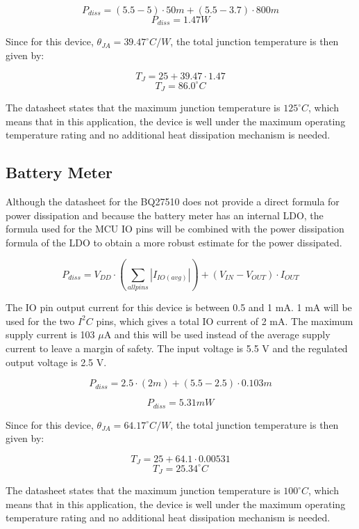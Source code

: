\documentclass[12pt,letterpaper]{article}
\begin{document}
\[P_{diss} = \left(5.5 - 5\right)\cdot 50m + \left(5.5 - 3.7\right)\cdot 800m\]
\[\boxed{P_{diss} = 1.47W}\]

Since for this device, $\theta_{JA} = 39.47^\circ C/W$, the total junction temperature is then given by:

\[T_J = 25 + 39.47 \cdot 1.47 \]
\[\boxed{T_J = 86.0 ^\circ C}\]

The datasheet states that the maximum junction temperature is $125^\circ C$, which means that in this application, the device is well under the maximum operating temperature rating and no additional heat dissipation mechanism is needed.

\subsection{Battery Meter}
Although the datasheet for the BQ27510 does not provide a direct formula for power dissipation and because the battery meter has an internal LDO, the formula used for the MCU IO pins will be combined with the power dissipation formula of the LDO to obtain a more robust estimate for the power dissipated.  

\[P_{diss} = V_{DD} \cdot \left(\sum_{allpins} |I_{IO(avg)}| \right) + \left(V_{IN} - V_{OUT}\right)\cdot I_{OUT}\]

The IO pin output current for this device is between 0.5 and 1 mA.  1 mA will be used for the two $I^2C$ pins, which gives a total IO current of 2 mA.  The maximum supply current is 103 $\mu$A and this will be used instead of the average supply current to leave a margin of safety.  The input voltage is 5.5 V and the regulated output voltage is 2.5 V.

\[P_{diss} = 2.5 \cdot \left(2m \right) + \left(5.5 - 2.5\right)\cdot 0.103m\]

\[\boxed{P_{diss} = 5.31 mW}\]

Since for this device, $\theta_{JA} = 64.17^\circ C/W$, the total junction temperature is then given by:

\[T_J = 25 + 64.1 \cdot 0.00531 \]
\[\boxed{T_J = 25.34 ^\circ C}\]

The datasheet states that the maximum junction temperature is $100^\circ C$, which means that in this application, the device is well under the maximum operating temperature rating and no additional heat dissipation mechanism is needed.



\end{document}
